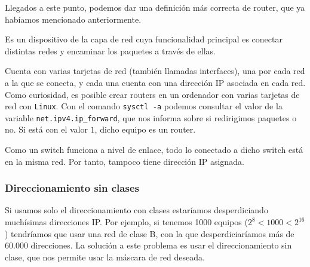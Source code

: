 Llegados a este punto, podemos dar una definición más correcta de router, que ya habíamos mencionado anteriormente.
\begin{definicion}[Router]
    Es un dispositivo de la capa de red cuya funcionalidad principal es conectar distintas redes y encaminar los paquetes a través de ellas.
    
    Cuenta con varias tarjetas de red (también llamadas interfaces), una por cada red a la que se conecta, y cada una cuenta con una dirección IP asociada en cada red.\\

    Como curiosidad, es posible crear routers en un ordenador con varias tarjetas de red con \verb|Linux|. Con el comando \verb|sysctl -a| podemos consultar el valor de la variable \verb|net.ipv4.ip_forward|, que nos informa sobre si redirigimos paquetes o no. Si está con el valor $1$, dicho equipo es un router.
\end{definicion}

\begin{observacion}
    Como un switch funciona a nivel de enlace, todo lo conectado a dicho switch está en la misma red. Por tanto, tampoco tiene dirección IP asignada.
\end{observacion}


\subsubsection{Direccionamiento sin clases}

Si usamos solo el direccionamiento con clases estaríamos desperdiciando muchísimas direcciones IP. Por ejemplo, si tenemos 1000 equipos ($2^8<1000<2^{16}$) tendríamos que usar una red de clase B, con la que desperdiciaríamos más de 60.000 direcciones. La solución a este problema es usar el direccionamiento sin clase, que nos permite usar la máscara de red deseada.

